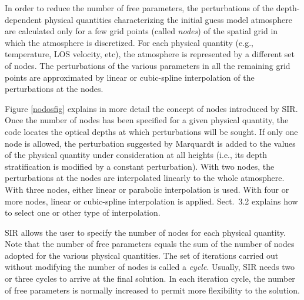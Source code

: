 In order to reduce the number of free parameters, the perturbations of
the depth-dependent physical quantities characterizing the initial guess 
model atmosphere are calculated only for a few grid points (called {\em nodes}) of the
spatial grid in which the atmosphere is discretized. For each physical
quantity (e.g., temperature, LOS velocity, etc), the atmosphere is
represented by a different set of nodes. The perturbations of the
various parameters in all the remaining grid points are approximated 
by linear or cubic-spline interpolation of the perturbations at the nodes.  


Figure \ref{nodosfig} explains in more detail the concept of nodes
introduced by SIR. Once the number of nodes has been specified for a
given physical quantity, the code locates the optical depths at which
perturbations will be sought. If only one node is allowed, the
perturbation suggested by Marquardt is added to the values of the
physical quantity under consideration at all heights (i.e., its depth
stratification is modified by a constant perturbation). With two nodes, the
perturbations at the nodes are interpolated linearly to the whole
atmosphere.  With three nodes, either linear or parabolic interpolation 
is used. With four or more nodes, linear or cubic-spline interpolation 
is applied. Sect.\ 3.2 explains how to select one or other type of
interpolation.

SIR allows the user to specify the number of nodes for each physical
quantity. Note that the number of free parameters equals the sum of the
number of nodes adopted for the various physical quantities. The set of
iterations carried out without modifying the number of nodes is called a
{\em cycle}. Usually, SIR needs two or three cycles to arrive at the final
solution. In each iteration cycle, the number of free parameters is normally 
increased to permit more flexibility to the solution.

